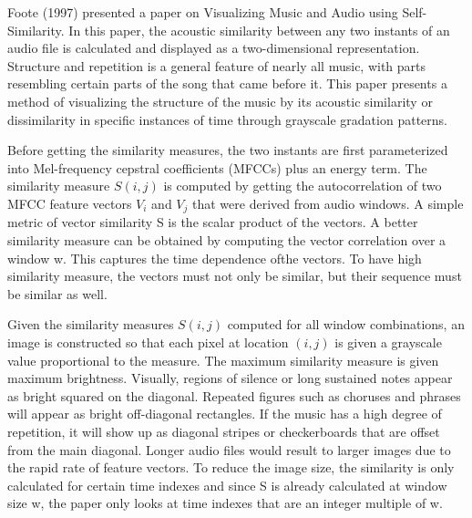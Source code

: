 	
	Foote (1997) presented a paper on Visualizing Music and Audio using Self-Similarity. In this paper, the acoustic similarity between any two instants of an audio file is calculated and displayed as a two-dimensional representation. Structure and repetition is a general feature of nearly all music, with parts resembling certain parts of the song that came before it. This paper presents a method of visualizing the structure of the music by its acoustic similarity or dissimilarity in specific instances of time through grayscale gradation patterns. 
	
	Before getting the similarity measures, the two instants  are first parameterized into Mel-frequency cepstral coefficients (MFCCs) plus an energy term. The similarity measure $S(i,j)$ is computed by getting the autocorrelation of two MFCC feature vectors $V_i$ and $V_j$ that were derived from audio windows. A simple metric of vector similarity S is the scalar product of the vectors. A better similarity measure can be obtained by computing the vector correlation over a window w. This captures the time dependence ofthe vectors. To have high similarity measure, the vectors must not only be similar, but their sequence must be similar as well. 

	Given the similarity measures $S(i,j)$ computed for all window combinations, an image is constructed so that each pixel at location $(i,j)$ is given a grayscale value proportional to the measure. The maximum similarity measure is given maximum brightness. Visually, regions of silence or long sustained notes appear as bright squared on the diagonal. Repeated figures such as choruses and phrases will appear as bright off-diagonal rectangles. If the music has a high degree of repetition, it will show up as diagonal stripes or checkerboards that are offset from the main diagonal. Longer audio files would result to larger images due to the rapid rate of feature vectors. To reduce the image size, the similarity is only calculated for certain time indexes and since S is already calculated at window size w, the paper only looks at time indexes that are an integer multiple of w.